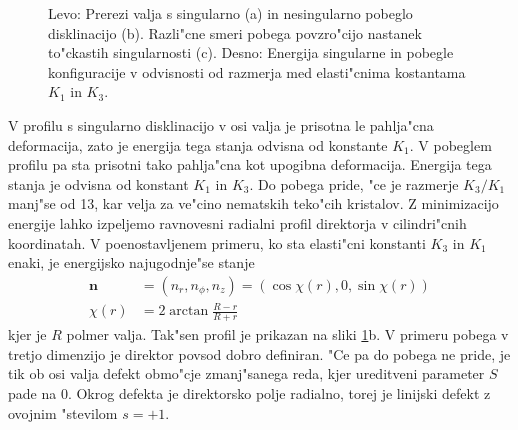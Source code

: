 \documentclass[12pt,twoside,openright,final]{report}
\renewcommand{\vec}{\mathbf}
\begin{document}
\begin{figure}[h]
\centering
{}
\caption{Levo: Prerezi valja s singularno (a) in nesingularno pobeglo disklinacijo (b). 
Razli"cne smeri pobega povzro"cijo nastanek to"ckastih singularnosti (c). Desno: Energija singularne in pobegle konfiguracije v odvisnosti od razmerja med elasti"cnima kostantama $K_1$ in $K_3$\cite{kleman}. }
 \label{fig:director-profiles}
\end{figure}

V profilu s singularno disklinacijo v osi valja je prisotna le pahlja"cna deformacija, zato je energija tega stanja odvisna od konstante $K_1$. 
V pobeglem profilu pa sta prisotni tako pahlja"cna kot upogibna deformacija. Energija tega stanja je odvisna od konstant $K_1$ in $K_3$. Do pobega pride, "ce je razmerje $K_3/K_1$ manj"se od 13, kar velja za ve"cino nematskih teko"cih kristalov. Z minimizacijo energije lahko izpeljemo ravnovesni radialni profil direktorja v cilindri"cnih koordinatah. V poenostavljenem primeru, ko sta elasti"cni konstanti $K_3$ in $K_1$ enaki, je energijsko najugodnje"se stanje\cite{kleman} 
\begin{align}
 \vec n &= (n_r, n_\phi, n_z) = (\cos \chi(r), 0, \sin \chi(r)) \\
 \chi(r) &= 2 \arctan \frac{R-r}{R+r}
\end{align}
kjer je $R$ polmer valja. Tak"sen profil je prikazan na sliki \ref{fig:director-profiles}b. V primeru pobega v tretjo dimenzijo je direktor povsod dobro definiran. "Ce pa do pobega ne pride, je tik ob osi valja defekt obmo"cje zmanj"sanega reda, kjer ureditveni parameter $S$ pade na 0. Okrog defekta je direktorsko polje radialno, torej je linijski defekt z ovojnim "stevilom $s=+1$. 
\end{document}
